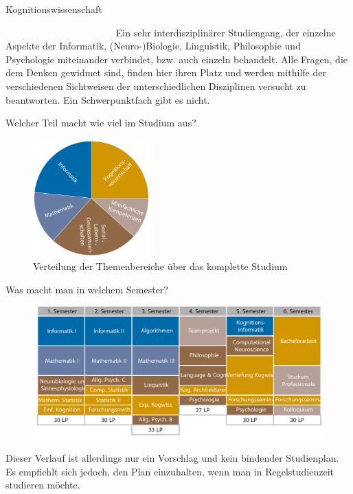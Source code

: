 	\begin{Huge}
			Kognitionswissenschaft
		\end{Huge}
		\begin{exampleblock}{\textcolor{white}{Was ist der Studiengang?}}
			Ein sehr interdisziplinärer Studiengang, der einzelne Aspekte der Informatik, (Neuro-)Biologie, Linguistik, Philosophie und Psychologie miteinander verbindet, bzw. auch einzeln behandelt. Alle Fragen, die dem Denken gewidmet sind, finden hier ihren Platz und werden mithilfe der verschiedenen Sichtweisen der unterschiedlichen Disziplinen versucht zu beantworten. Ein Schwerpunktfach gibt es nicht.
		\end{exampleblock}
	
	\begin{block}{Welcher Teil macht wie viel im Studium aus?}
		\begin{figure}[h!]
			\includegraphics[width=0.4\textwidth]{charts/kognitionswissenschaft-Piechart.pdf}
			\caption{Verteilung der Themenbereiche über das komplette Studium}
		\end{figure}
	\end{block}
	
	\begin{block}{Was macht man in welchem Semester?}
		\begin{figure}[h!]
			\includegraphics[width=\textwidth]{charts/kognitionswissenschaft_StudienplanabWS18.pdf}
		\end{figure}
		Dieser Verlauf ist allerdings nur ein Vorschlag und kein bindender Studienplan. Es empfiehlt sich jedoch, den Plan einzuhalten, wenn man in Regelstudienzeit studieren möchte.
	\end{block}
